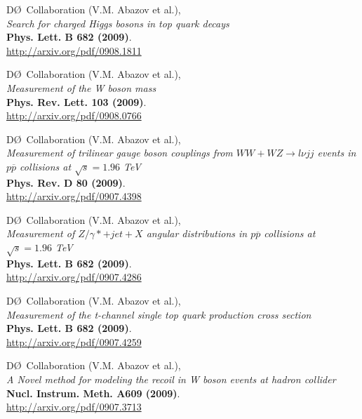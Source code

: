 \documentclass[12pt]{article}
\begin{document}
%
D\O~Collaboration (V.M. Abazov et al.), \\
\textsl{Search for charged Higgs bosons in top quark decays}\\
\textbf{Phys. Lett. B 682 (2009)}.\\
{\small{\url{http://arxiv.org/pdf/0908.1811}}}\vspace{4mm}

%
D\O~Collaboration (V.M. Abazov et al.), \\
\textsl{Measurement of the W boson mass}\\
\textbf{Phys. Rev. Lett. 103 (2009)}.\\
{\small{\url{http://arxiv.org/pdf/0908.0766}}}\vspace{4mm}

%
D\O~Collaboration (V.M. Abazov et al.), \\
\textsl{Measurement of trilinear gauge boson couplings from $WW + WZ \rightarrow l\nu jj$ events in $p\overline{p}$ collisions at $\sqrt{s}=1.96$ TeV}\\
\textbf{Phys. Rev. D 80 (2009)}.\\
{\small{\url{http://arxiv.org/pdf/0907.4398}}}\vspace{4mm}

%
D\O~Collaboration (V.M. Abazov et al.), \\
\textsl{Measurement of $Z/\gamma*+jet+X$ angular distributions in $p\overline{p}$ collisions at $\sqrt{s}=1.96$ TeV}\\
\textbf{Phys. Lett. B 682 (2009)}.\\
{\small{\url{http://arxiv.org/pdf/0907.4286}}}\vspace{4mm}

%
D\O~Collaboration (V.M. Abazov et al.), \\
\textsl{Measurement of the t-channel single top quark production cross section}\\
\textbf{Phys. Lett. B 682 (2009)}.\\
{\small{\url{http://arxiv.org/pdf/0907.4259}}}\vspace{4mm}

%
D\O~Collaboration (V.M. Abazov et al.), \\
\textsl{A Novel method for modeling the recoil in W boson events at hadron collider}\\
\textbf{Nucl. Instrum. Meth. A609 (2009)}.\\
{\small{\url{http://arxiv.org/pdf/0907.3713}}}\vspace{4mm}
\end{document}
